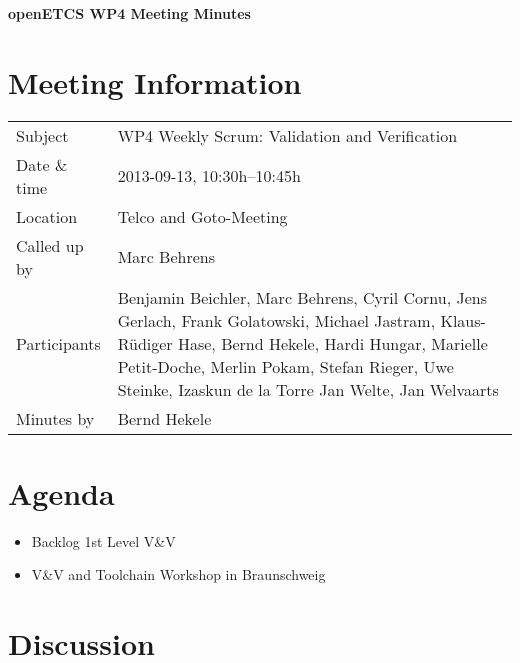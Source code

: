 \documentclass[a4paper, 11pt]{article}
\begin{document}
{\begin{center}\huge\bf openETCS WP4 Meeting Minutes\end{center}}
\section{Meeting Information}

\renewcommand{\arraystretch}{1.5}
\begin{supertabular}{m{.2\textwidth}m{.8\textwidth}}
Subject & WP4 Weekly Scrum: Validation and Verification\\
Date \& time & 2013-09-13, 10:30h--10:45h\\
Location & Telco and Goto-Meeting\\
Called up by & Marc Behrens\\
Participants &
Benjamin Beichler,
Marc Behrens,
Cyril Cornu,
Jens Gerlach,
Frank Golatowski,
Michael Jastram,
Klaus-R\"udiger Hase,
Bernd Hekele,
Hardi Hungar,
Marielle Petit-Doche,
Merlin Pokam,
Stefan Rieger,
Uwe Steinke,
Izaskun de la Torre
Jan Welte,
Jan Welvaarts
\\

Minutes by & Bernd Hekele\\

\end{supertabular}
\renewcommand{\arraystretch}{1.0}


\section{{Agenda}}
\begin{itemize}
\item Backlog 1st Level V\&V
\item V\&V and Toolchain Workshop in Braunschweig
\end{itemize}

\section{Discussion}
\end{document}
